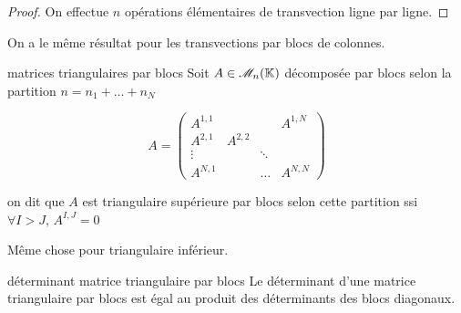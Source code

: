 \begin{proof}
    On effectue $n$ opérations élémentaires de transvection ligne par ligne.
\end{proof}

\begin{remarque}
    On a le même résultat pour les transvections par blocs de colonnes.
\end{remarque}

\begin{definition}{matrices triangulaires par blocs}{}
    Soit $A \in \mathscr M_{n}(\mathbb{K})$ décomposée par blocs selon la partition $n = n_1 + \dots + n_N$

    $$A = \left( \begin{array}{c|c|c|c}
        A^{1, 1} & & & A^{1, N} \\
        \hline
        A^{2, 1} & A^{2, 2} & & \\
        \hline
        \vdots & & \ddots &  \\
        \hline
        A^{N, 1} & & \dots & A^{N, N} 
    \end{array}  \right) $$

    on dit que $A$ est triangulaire supérieure par blocs selon cette partition ssi 
    $\forall I > J, \, A^{I, J} = 0$

    Même chose pour triangulaire inférieur. 
    
\end{definition}

\begin{theoreme}{déterminant matrice triangulaire par blocs }{}
    Le déterminant d'une matrice triangulaire par blocs est égal au produit 
    des déterminants des blocs diagonaux. 
\end{theoreme}


